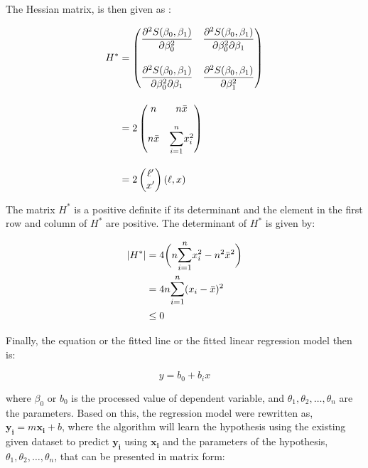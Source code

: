 \documentclass[12pt]{article}
\begin{document}
The Hessian matrix, is then given as :

\singlespacing
\begin{align}
	H^\ast &= \begin{pmatrix}
		\mathlarger{\frac{\partial ^2 S(\beta_0, \beta_1)}{\partial \beta_0^2}} & \mathlarger{\frac{\partial ^2 S(\beta_0, \beta_1)}{\partial \beta_0^2 \partial \beta_1}} \\[2em]
		\mathlarger{\frac{\partial ^2 S(\beta_0, \beta_1)}{\partial \beta_0^2 \partial \beta_1}} & \mathlarger{\frac{\partial ^2 S(\beta_0, \beta_1)}{\partial \beta_1^2}}
	\end{pmatrix} \\[1em]
	&= 2 \begin{pmatrix}
		n & n \bar{x} \\[1em]
		n \bar{x} & \mathlarger{\sum^{n}_{i=1}} x^2_i         
	\end{pmatrix} \\[1em]
	&= 2 \begin{pmatrix}
		\ell ' \\
		x'
	\end{pmatrix} (\ell, x)
\end{align}
\doublespacing

The matrix $H^\ast$ is a positive definite if its determinant and the element in the first row and column of $H^\ast$ are positive. The determinant of $H^\ast$ is given by:

\begin{align}
	|H^\ast| &= 4 \bigg ( n  \mathlarger{\sum^{n}_{i=1}} x_i^2 - n^2 \bar{x} ^2 \bigg ) \\
	&= 4n \mathlarger{\sum^{n}_{i=1}} (x_i - \bar{x})^2 \\ 
	&\leq 0 \nonumber
\end{align}

Finally, the equation or the fitted line or the fitted linear regression model then is:

\begin{equation}
	y = b_0 + b_i x
\end{equation}

where $\beta_0$ or $b_0$ is the processed value of dependent variable, and $\theta_1, \theta_2, \dots, \theta_n$ are the parameters. Based on this, the regression model were rewritten as, $\boldsymbol{y_i} = m\boldsymbol{x_i} + b$, where the algorithm will learn the hypothesis using the existing given dataset to predict $\boldsymbol{y_i}$ using $\boldsymbol{x_i}$ and the parameters of the hypothesis, $\theta_1, \theta_2, \dots, \theta_n$, that can be presented in matrix form:
\end{document}
